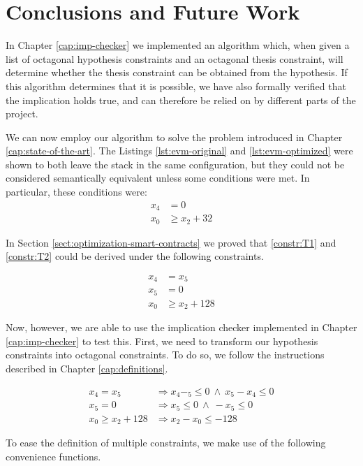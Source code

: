 \chapter{Conclusions and Future Work}
\label{cap:conclusions}

In Chapter \ref{cap:imp-checker} we implemented an algorithm which, when given a list of octagonal
hypothesis constraints and an octagonal thesis constraint, will determine whether
the thesis constraint can be obtained from the hypothesis. If this algorithm
determines that it is possible, we have also formally verified that the implication
holds true, and can therefore be relied on by different parts of the project.

We can now employ our algorithm to solve the problem introduced in Chapter
\ref{cap:state-of-the-art}. The Listings \ref{lst:evm-original} and \ref{lst:evm-optimized}
were shown to both leave the stack in the same configuration, but they could
not be considered semantically equivalent unless some conditions were met. In
particular, these conditions were:
\begin{align}
    \label{constr:T1} x_4 &= 0 \\
    \label{constr:T2} x_0 &\ge x_2 + 32
\end{align}

In Section \ref{sect:optimization-smart-contracts} we proved that \ref{constr:T1} and \ref{constr:T2} could be derived under the following constraints.

\begin{align*}
    x_4 &= x_5 \\
    x_5 &= 0 \\
    x_0 &\ge x_2 + 128
\end{align*}

Now, however, we are able to use the implication checker implemented in Chapter
\ref{cap:imp-checker} to test this. First, we need to transform our hypothesis
constraints into octagonal constraints. To do so, we follow the instructions
described in Chapter \ref{cap:definitions}.

\begin{align*}
    x_4 = x_5 &\Longrightarrow x_4 - _5 \le 0 \ \wedge\  x_5 - x_4 \le 0
    \\
    x_5 = 0 &\Longrightarrow x_5 \le 0 \ \wedge\ -x_5 \le 0
    \\
    x_0 \ge x_2 + 128 &\Longrightarrow x_2 - x_0 \le -128
\end{align*}

To ease the definition of multiple constraints, we make use of the following
convenience functions.

